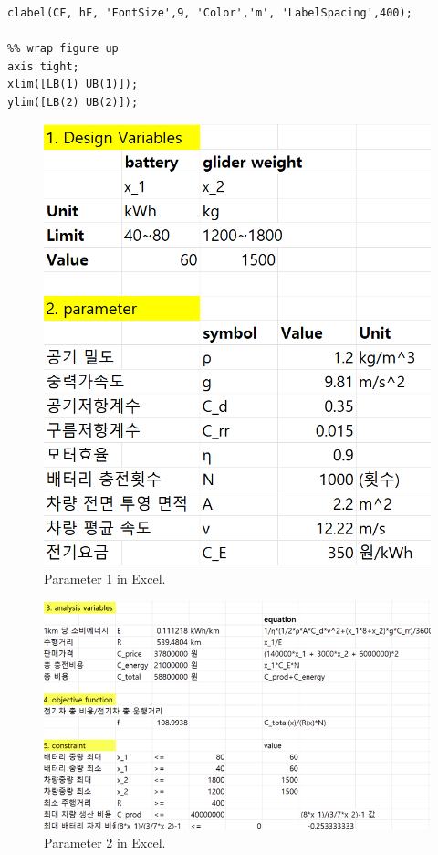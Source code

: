 \documentclass[11pt,twocolumn]{article}
\begin{document}
\begin{enumerate}
\begin{lstlisting}[firstnumber=last]
clabel(CF, hF, 'FontSize',9, 'Color','m', 'LabelSpacing',400);

%% wrap figure up
axis tight;
xlim([LB(1) UB(1)]);
ylim([LB(2) UB(2)]);
                    \end{lstlisting}
                \end{enumerate}
                \begin{figure}[h]
                        \centering
                        \includegraphics[width=.6\columnwidth]{Excel111.png}
                        \caption{Parameter 1 in Excel.}
                        \label{param1}
                \end{figure}
                \begin{figure}[h]
                        \centering
                        \includegraphics[width=.8\columnwidth]{Excel22.png}
                        \caption{Parameter 2 in Excel.}
                        \label{param2}
                \end{figure}
\end{document}
